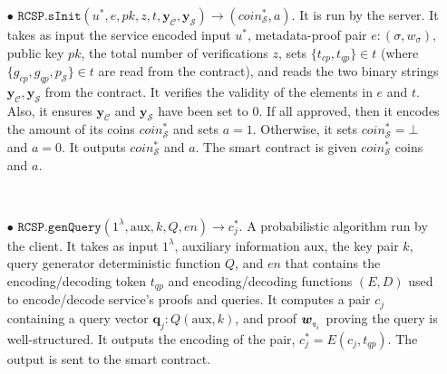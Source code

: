 \begin{definition}[RC-S-P Scheme]
\begin{itemize}
\

\item[$\bullet$] $\mathtt{RCSP}.\mathtt{sInit}(u^{\scriptscriptstyle *},e, pk,z, t,\bm{y}_{\scriptscriptstyle \mathcal  C},\bm{y}_{\scriptscriptstyle \mathcal  S})\rightarrow (coin^{\scriptscriptstyle *}_{\scriptscriptstyle\mathcal S},a)$. It is  run by the server. It takes as input the  service encoded input $u^{\scriptscriptstyle *}$, metadata-proof pair $e:(\sigma,w_{\scriptscriptstyle\sigma})$,  public key $pk$, the total number of verifications $z$, sets $\{t_{\scriptscriptstyle cp},t_{\scriptscriptstyle qp}\}\in t$ (where $\{g_{\scriptscriptstyle cp},  g_{\scriptscriptstyle qp},p_{\scriptscriptstyle\mathcal S}\}\in t$ are read from the contract), and reads the two binary strings $\bm{y}_{\scriptscriptstyle \mathcal  C}, \bm{y}_{\scriptscriptstyle \mathcal  S}$ from the contract.  It verifies the validity of the elements in $e$ and  $t$. Also, it ensures $\bm{y}_{\scriptscriptstyle \mathcal  C}$ and $\bm{y}_{\scriptscriptstyle \mathcal  S}$ have been set to $0$. If all approved, then it encodes the amount of its coins  $coin^{\scriptscriptstyle*}_{\scriptscriptstyle\mathcal S}$ and sets $a=1$. Otherwise, it sets $coin^{\scriptscriptstyle *}_{\scriptscriptstyle\mathcal S}=\bot$ and $a=0$. It outputs $coin^{\scriptscriptstyle *}_{\scriptscriptstyle\mathcal S}$ and $a$. The smart contract is given $coin^{\scriptscriptstyle *}_{\scriptscriptstyle\mathcal S}$ coins and $a$.  

\

\item[$\bullet$] $\mathtt{RCSP}.\mathtt{genQuery}(1^{\scriptscriptstyle\lambda}, \text{aux},k,Q, en)\rightarrow c^{\scriptscriptstyle *}_{\scriptscriptstyle j}$. A probabilistic algorithm run by the client. It takes as input  $1^{\scriptscriptstyle\lambda}$,  auxiliary information $\text{aux}$,  the key pair $k$,   query generator deterministic function $Q$,  and $en$ that contains the encoding/decoding token  $t_{\scriptscriptstyle qp}$ and  encoding/decoding functions $(E,D)$  used to encode/decode service's proofs and queries.  It computes a pair $c_{\scriptscriptstyle j}$ containing a query vector $\bm{q}_{\scriptscriptstyle j}:Q( \text{aux},k)$,  and proof $\bm{w}_{\scriptscriptstyle q_{_{\scaleto{j}{\size}}}}$ proving the query is well-structured. It outputs the encoding of the pair, $c^{\scriptscriptstyle *}_{\scriptscriptstyle j}=E(c_{\scriptscriptstyle j},t_{\scriptscriptstyle qp})$. The output is sent to the smart contract. 



\end{itemize}
\end{definition}
